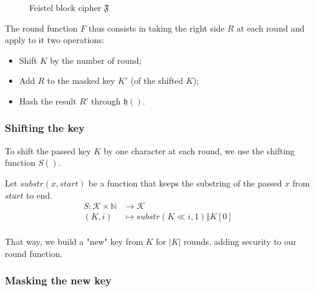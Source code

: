 \documentclass[twoside,twocolumn]{article}
\theoremstyle{definition}
\theoremstyle{remark}
\begin{document}
\begin{figure}
    \caption{Feistel block cipher $\mathfrak{F}$}
    \label{fig:feistel}
\end{figure}

The round function $F$ thus consists in taking the right side $R$ at each round and apply to it two operations:
\begin{itemize}
    \item Shift $K$ by the number of round;
    \item Add $R$ to the masked key $K'$ (of the shifted $K$);
    \item Hash the result $R'$ through $\mathfrak{h}()$.
\end{itemize}

\subsubsection{Shifting the key}

To shift the passed key $K$ by one character at each round, we use the shifting function $S()$.

Let $substr(x, start)$ be a function that keeps the substring of the passed $x$ from $start$ to end.
\begin{equation}
    \label{eq:shifting}
    \begin{array}{rl}
        S: \mathcal{K} \times \mathbb{N} &\to \mathcal{K} \\
            (K, i) &\mapsto substr(K \ll i, 1) \mathbin\Vert K[0] \\
    \end{array}
\end{equation}

That way, we build a "new" key from $K$ for $|K|$ rounds, adding security to our round function.

\subsubsection{Masking the new key}
\end{document}
